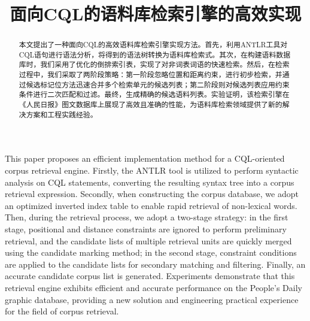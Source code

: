 \documentclass[11pt]{article}
\title{面向CQL的语料库检索引擎的高效实现}
\date{}
\begin{document}
\begin{CJK*}{UTF8}{gbsn}
\setlength{\parindent}{2em}

\maketitle
\begin{abstract}
  
本文提出了一种面向CQL的高效语料库检索引擎实现方法。首先，利用ANTLR工具对CQL语句进行语法分析，将得到的语法树转换为语料库检索式。其次，在构建语料数据库时，我们采用了优化的倒排索引表，实现了对非词表词语的快速检索。然后，在检索过程中，我们采取了两阶段策略：第一阶段忽略位置和距离约束，进行初步检索，并通过候选标记位方法迅速合并多个检索单元的候选列表；第二阶段则对候选列表应用约束条件进行二次匹配和过滤。最终，生成精确的候选语料列表。实验证明，该检索引擎在《人民日报》图文数据库上展现了高效且准确的性能，为语料库检索领域提供了新的解决方案和工程实践经验。

\end{abstract}

\makeenglishtitle
\begin{englishabstract}
	
This paper proposes an efficient implementation method for a CQL-oriented corpus retrieval engine. Firstly, the ANTLR tool is utilized to perform syntactic analysis on CQL statements, converting the resulting syntax tree into a corpus retrieval expression. Secondly, when constructing the corpus database, we adopt an optimized inverted index table to enable rapid retrieval of non-lexical words. Then, during the retrieval process, we adopt a two-stage strategy: in the first stage, positional and distance constraints are ignored to perform preliminary retrieval, and the candidate lists of multiple retrieval units are quickly merged using the candidate marking method; in the second stage, constraint conditions are applied to the candidate lists for secondary matching and filtering. Finally, an accurate candidate corpus list is generated. Experiments demonstrate that this retrieval engine exhibits efficient and accurate performance on the People's Daily graphic database, providing a new solution and engineering practical experience for the field of corpus retrieval.

  
\end{englishabstract}



\end{CJK*}
\end{document}
